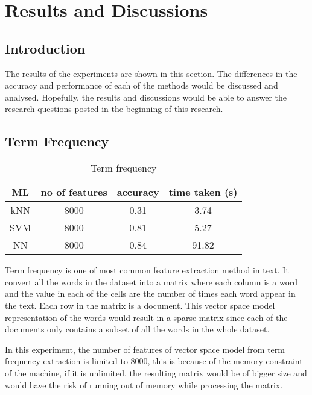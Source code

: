 
\chapter{Results and Discussions}

\section{Introduction}
The results of the experiments are shown in this section. The differences in the accuracy and performance of each of the methods would be discussed and analysed. Hopefully, the results and discussions would be able to answer the research questions posted in the beginning of this research.\\

\section{Term Frequency}

\begin{table}[H]
	\centering
	\caption{Term frequency}
	\label{tbl:termFrequency}
	\begin{tabular}{|| c | c | c | c||}
		\hline
		ML & no of features & accuracy & time taken (s) \\ [0.5ex]
		\hline\hline
		kNN & 8000 & 0.31 & 3.74 \\ 
		\hline
		SVM & 8000 & 0.81 & 5.27 \\
		\hline
		NN & 8000 & 0.84 & 91.82 \\
		\hline
	\end{tabular}
\end{table}

Term frequency is one of most common feature extraction method in text. It convert all the words in the dataset into a matrix where each column is a word and the value in each of the cells are the number of times each word appear in the text. Each row in the matrix is a document. This vector space model representation of the words would result in a sparse matrix since each of the documents only contains a subset of all the words in the whole dataset. 

In this experiment, the number of features of vector space model from term frequency extraction is limited to 8000, this is because of the memory constraint of the machine, if it is unlimited, the resulting matrix would be of bigger size and would have the risk of running out of memory while processing the matrix. 


